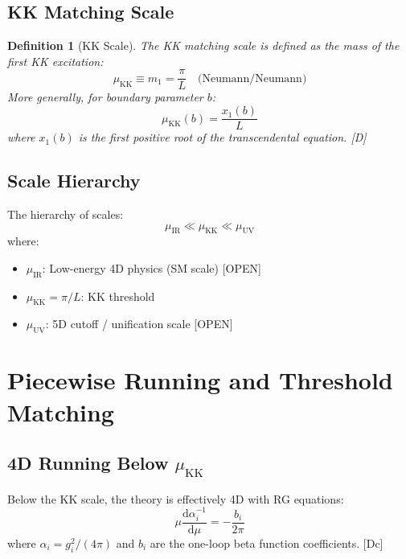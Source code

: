 \documentclass[11pt,a4paper]{article}
\newtheorem{definition}[theorem]{Definition}
\newcommand{\dd}{\mathrm{d}}
\begin{document}
\subsection{KK Matching Scale}

\begin{definition}[KK Scale]
\label{def:kk-scale}
The KK matching scale is defined as the mass of the first KK excitation:
\begin{equation}
\boxed{
\mu_{\text{KK}} \equiv m_1 = \frac{\pi}{L} \quad \text{(Neumann/Neumann)}
}
\label{eq:kk-scale}
\end{equation}
More generally, for boundary parameter $b$:
\begin{equation}
\mu_{\text{KK}}(b) = \frac{x_1(b)}{L}
\label{eq:kk-scale-general}
\end{equation}
where $x_1(b)$ is the first positive root of the transcendental equation. [D]
\end{definition}

\subsection{Scale Hierarchy}

The hierarchy of scales:
\begin{equation}
\mu_{\text{IR}} \ll \mu_{\text{KK}} \ll \mu_{\text{UV}}
\label{eq:scale-hierarchy}
\end{equation}
where:
\begin{itemize}
\item $\mu_{\text{IR}}$: Low-energy 4D physics (SM scale) [OPEN]
\item $\mu_{\text{KK}} = \pi/L$: KK threshold
\item $\mu_{\text{UV}}$: 5D cutoff / unification scale [OPEN]
\end{itemize}

\section{Piecewise Running and Threshold Matching}
\label{sec:running}

\subsection{4D Running Below $\mu_{\text{KK}}$}

Below the KK scale, the theory is effectively 4D with RG equations:
\begin{equation}
\mu \frac{\dd \alpha_i^{-1}}{\dd \mu} = -\frac{b_i}{2\pi}
\label{eq:4d-running}
\end{equation}
where $\alpha_i = g_i^2/(4\pi)$ and $b_i$ are the one-loop beta function coefficients. [Dc]
\end{document}
